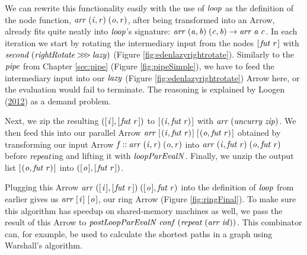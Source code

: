 \documentclass[paper=A4,twoside=true,openright,parskip=full,chapterprefix=true,headings=normal,bibliography=totoc,listof=totoc,titlepage=on,captions=tableabove,draft=false,british]{scrreprt}%
\begin{document}
We can rewrite this functionality easily with the use of \ensuremath{\Varid{loop}} as the
definition of the node function, \ensuremath{\Varid{arr}\;(\Varid{i},\Varid{r})\;(\Varid{o},\Varid{r})}, after being
transformed into an Arrow, already fits quite neatly into \ensuremath{\Varid{loop}}'s
signature: \ensuremath{\Varid{arr}\;(\Varid{a},\Varid{b})\;(\Varid{c},\Varid{b})\to \Varid{arr}\;\Varid{a}\;\Varid{c}}. In each iteration we start by
rotating the intermediary input from the nodes \ensuremath{[\mskip1.5mu \Varid{fut}\;\Varid{r}\mskip1.5mu]} with
\ensuremath{\Varid{second}\;(\Varid{rightRotate}\mathbin{>\!\!>\!\!>}\Varid{lazy})} (Figure \ref{fig:edenlazyrightrotate}).
Similarly to the \ensuremath{\Varid{pipe}} from Chapter \ref{sec:pipe} (Figure
\ref{fig:pipeSimple}), we have to feed the intermediary input into our
\ensuremath{\Varid{lazy}} (Figure \ref{fig:edenlazyrightrotate}) Arrow here, or the
evaluation would fail to terminate. The reasoning is explained by Loogen
(\protect\hyperlink{ref-Loogen2012}{2012}) as a demand problem.

Next, we zip the resulting \ensuremath{([\mskip1.5mu \Varid{i}\mskip1.5mu],[\mskip1.5mu \Varid{fut}\;\Varid{r}\mskip1.5mu])} to \ensuremath{[\mskip1.5mu (\Varid{i},\Varid{fut}\;\Varid{r})\mskip1.5mu]} with
\ensuremath{\Varid{arr}\;(\Varid{uncurry}\;\Varid{zip})}. We then feed this into our parallel Arrow
\ensuremath{\Varid{arr}\;[\mskip1.5mu (\Varid{i},\Varid{fut}\;\Varid{r})\mskip1.5mu]\;[\mskip1.5mu (\Varid{o},\Varid{fut}\;\Varid{r})\mskip1.5mu]} obtained by transforming our input Arrow
\ensuremath{\Varid{f}\mathbin{::}\Varid{arr}\;(\Varid{i},\Varid{r})\;(\Varid{o},\Varid{r})} into \ensuremath{\Varid{arr}\;(\Varid{i},\Varid{fut}\;\Varid{r})\;(\Varid{o},\Varid{fut}\;\Varid{r})} before
\ensuremath{\Varid{repeat}}ing and lifting it with \ensuremath{\Varid{loopParEvalN}}. Finally, we unzip the
output list \ensuremath{[\mskip1.5mu (\Varid{o},\Varid{fut}\;\Varid{r})\mskip1.5mu]} into \ensuremath{([\mskip1.5mu \Varid{o}\mskip1.5mu],[\mskip1.5mu \Varid{fut}\;\Varid{r}\mskip1.5mu])}.

Plugging this Arrow \ensuremath{\Varid{arr}\;([\mskip1.5mu \Varid{i}\mskip1.5mu],[\mskip1.5mu \Varid{fut}\;\Varid{r}\mskip1.5mu])\;([\mskip1.5mu \Varid{o}\mskip1.5mu],\Varid{fut}\;\Varid{r})} into the
definition of \ensuremath{\Varid{loop}} from earlier gives us \ensuremath{\Varid{arr}\;[\mskip1.5mu \Varid{i}\mskip1.5mu]\;[\mskip1.5mu \Varid{o}\mskip1.5mu]}, our ring Arrow
(Figure \ref{fig:ringFinal}). To make sure this algorithm has speedup on
shared-memory machines as well, we pass the result of this Arrow to
\ensuremath{\Varid{postLoopParEvalN}\;\Varid{conf}\;(\Varid{repeat}\;(\Varid{arr}\;\Varid{id}))}. This combinator can, for
example, be used to calculate the shortest paths in a graph using
Warshall's algorithm.
\end{document}
